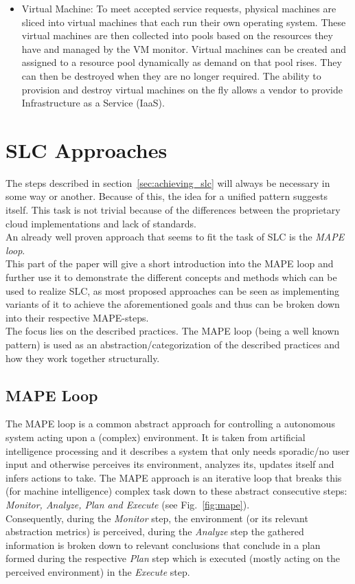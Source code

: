\documentclass[a4paper]{llncs}
\begin{document}
\begin{itemize}
	\item Virtual Machine: To meet accepted service requests, physical machines are sliced into virtual machines that each run their own operating system. These virtual machines are then collected into pools based on the resources they have and managed by the VM monitor. Virtual machines can be created and assigned to a resource pool dynamically as demand on that pool rises. They can then be destroyed when they are no longer required. The ability to provision and destroy virtual machines on the fly allows a vendor to provide Infrastructure as a Service (IaaS).\\
	\end{itemize}

\section{SLC Approaches}
The steps described in section~\ref{sec:achieving_slc} will always be necessary in some way or another. Because of this, the idea for a unified pattern suggests itself. This task is not trivial because of the differences between the proprietary cloud implementations and lack of standards.\\

An already well proven approach that seems to fit the task of SLC is the \textit{MAPE loop}.\\
This part of the paper will give a short introduction into the MAPE loop and further use it to demonstrate the different concepts and methods which can be used to realize SLC, as most proposed approaches can be seen as implementing variants of it to achieve the aforementioned goals and thus can be broken down into their respective MAPE-steps.\\
The focus lies on the described practices. The MAPE loop (being a well known pattern) is used as an abstraction/categorization of the described practices and how they work together structurally.

\subsection{MAPE Loop}
The MAPE loop is a common abstract approach for controlling a autonomous system acting upon a (complex) environment. It is taken from artificial intelligence processing and it describes a system that only needs sporadic/no user input and otherwise perceives its environment, analyzes its, updates itself and infers actions to take. The MAPE approach is an iterative loop that breaks this (for machine intelligence) complex task down to these abstract consecutive steps: \textit{Monitor, Analyze, Plan and Execute} (see Fig.~\ref{fig:mape}).\\
Consequently, during the \textit{Monitor} step, the environment (or its relevant abstraction metrics) is perceived, during the \textit{Analyze} step the gathered information is broken down to relevant conclusions that conclude in a plan formed during the respective \textit{Plan} step which is executed (mostly acting on the perceived environment) in the \textit{Execute} step.\\
\end{document}
